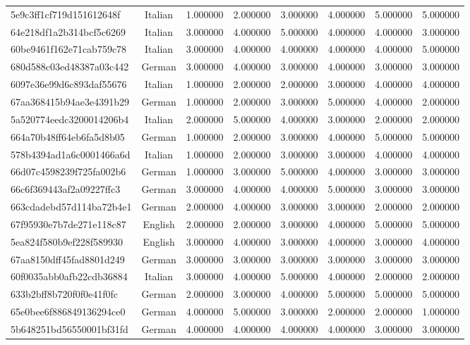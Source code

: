 \begin{table}[htbp]
\begin{tabular}{lccccccc}
5e9c3ff1cf719d151612648f & Italian & 1.000000 & 2.000000 & 3.000000 & 4.000000 & 5.000000 & 5.000000 \\
64e218df1a2b314bcf5c6269 & Italian & 3.000000 & 4.000000 & 5.000000 & 4.000000 & 4.000000 & 3.000000 \\
60be9461f162e71cab759c78 & Italian & 3.000000 & 4.000000 & 4.000000 & 4.000000 & 4.000000 & 5.000000 \\
680d588c03ed48387a03c442 & German & 3.000000 & 4.000000 & 3.000000 & 4.000000 & 3.000000 & 3.000000 \\
6097e36e99d6c893daf55676 & Italian & 1.000000 & 2.000000 & 2.000000 & 3.000000 & 4.000000 & 4.000000 \\
67aa368415b94ae3e4391b29 & German & 1.000000 & 2.000000 & 3.000000 & 5.000000 & 4.000000 & 2.000000 \\
5a520774eedc3200014206b4 & Italian & 2.000000 & 5.000000 & 4.000000 & 3.000000 & 2.000000 & 2.000000 \\
664a70b48ff64eb6fa5d8b05 & German & 1.000000 & 2.000000 & 3.000000 & 4.000000 & 5.000000 & 5.000000 \\
578b4394ad1a6c0001466a6d & Italian & 1.000000 & 2.000000 & 3.000000 & 3.000000 & 4.000000 & 4.000000 \\
66d07c4598239f725fa002b6 & German & 1.000000 & 3.000000 & 5.000000 & 4.000000 & 3.000000 & 3.000000 \\
66c6f369443af2a09227ffc3 & German & 3.000000 & 4.000000 & 4.000000 & 5.000000 & 3.000000 & 3.000000 \\
663cdadebd57d114ba72b4e1 & German & 2.000000 & 4.000000 & 3.000000 & 3.000000 & 2.000000 & 2.000000 \\
67f95930e7b7de271e118c87 & English & 2.000000 & 2.000000 & 3.000000 & 4.000000 & 5.000000 & 5.000000 \\
5ea824f580b9ef228f589930 & English & 3.000000 & 4.000000 & 3.000000 & 4.000000 & 3.000000 & 4.000000 \\
67aa8150dff45fad8801d249 & German & 3.000000 & 3.000000 & 3.000000 & 3.000000 & 3.000000 & 3.000000 \\
60f0035abb0afb22cdb36884 & Italian & 3.000000 & 4.000000 & 5.000000 & 4.000000 & 2.000000 & 2.000000 \\
633b2bff8b720f0f0e41f0fc & German & 2.000000 & 3.000000 & 4.000000 & 5.000000 & 5.000000 & 5.000000 \\
65e0bee6f886849136294ce0 & German & 4.000000 & 5.000000 & 3.000000 & 2.000000 & 2.000000 & 1.000000 \\
5b648251bd56550001bf31fd & German & 4.000000 & 4.000000 & 4.000000 & 4.000000 & 3.000000 & 3.000000 \\

\end{tabular}
\end{table}
